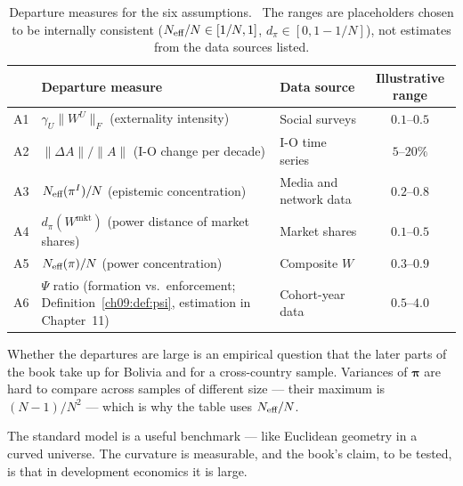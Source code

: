 \documentclass[../structural_economics_book.tex]{subfiles}
\begin{document}
\begin{table}[h]
\centering
\small
\begin{tabularx}{\textwidth}{cLLc}
\toprule
& \textbf{Departure measure} & \textbf{Data source} & \textbf{Illustrative range} \\
\midrule
A1 & $\gamma_U \|W^U\|_F$ (externality intensity) & Social surveys & $0.1$--$0.5$ \\
A2 & $\|\Delta A\| / \|A\|$ (I-O change per decade) & I-O time series & $5$--$20\%$ \\
A3 & $N_{\text{eff}}(\pi^I)/N$ (epistemic concentration) & Media and network data & $0.2$--$0.8$ \\
A4 & $d_\pi(W^{\text{mkt}})$ (power distance of market shares) & Market shares & $0.1$--$0.5$ \\
A5 & $N_{\text{eff}}(\pi)/N$ (power concentration) & Composite $W$ & $0.3$--$0.9$ \\
A6 & $\Psi$ ratio (formation vs.\ enforcement; Definition~\ref{ch09:def:psi}, estimation in Chapter~11) & Cohort-year data & $0.5$--$4.0$ \\
\bottomrule
\end{tabularx}
\caption{Departure measures for the six assumptions. \illustrative\ The ranges are placeholders chosen to be internally consistent ($\Neff/N \in [1/N, 1]$, $d_\pi \in [0, 1 - 1/N]$), not estimates from the data sources listed.}
\label{ch04:tab:departures}
\end{table}

Whether the departures are large is an empirical question that the later parts of the book take up for Bolivia and for a cross-country sample. Variances of $\boldsymbol{\pi}$ are hard to compare across samples of different size --- their maximum is $(N-1)/N^2$ --- which is why the table uses $N_{\text{eff}}/N$.

The standard model is a useful benchmark --- like Euclidean geometry in a curved universe. The curvature is measurable, and the book's claim, to be tested, is that in development economics it is large.
\end{document}
